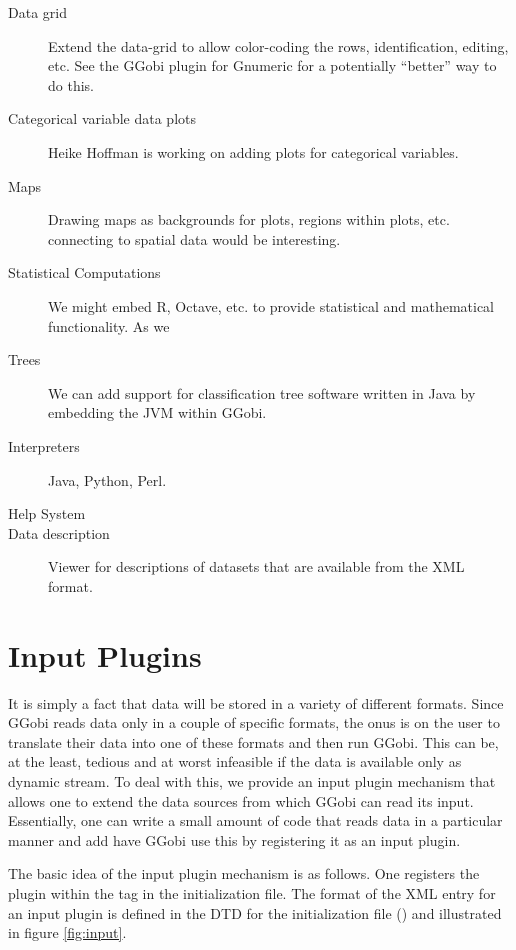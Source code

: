 \documentclass{article}
\def\file#1{\href{#1}{\Escape{#1}}}
\begin{document}
\begin{description}

\item[Data grid] Extend the data-grid to allow color-coding the rows,
identification, editing, etc.  See the GGobi plugin for Gnumeric for a
potentially ``better'' way to do this.

\item[Categorical variable data plots]
Heike Hoffman is working on
adding plots for categorical variables.

\item[Maps]
Drawing maps  as backgrounds for plots,
regions within plots, etc.
connecting to spatial data would be interesting.

\item[Statistical Computations] We might embed R, Octave, etc.  to
provide statistical and mathematical functionality.  As we

\item[Trees]
We can add support for classification tree software
written in Java by embedding the JVM within GGobi.

\item[Interpreters]
Java, Python, Perl.

\item[Help System]

\item[Data description]
Viewer for descriptions of datasets
that are available from the XML
format.

\end{description}

\section{Input Plugins}\label{sec:InputPlugins}
It is simply a fact that data will be stored in a variety of different
formats. Since GGobi reads data only in a couple of specific formats,
the onus is on the user to translate their data into one of these
formats and then run GGobi. This can be, at the least, tedious and at
worst infeasible if the data is available only as dynamic stream.  To
deal with this, we provide an input plugin mechanism that allows one
to extend the data sources from which GGobi can read its input.
Essentially, one can write a small amount of code that reads
data in a particular manner and add have GGobi use this 
by registering it as an input plugin.

The basic idea of the input plugin mechanism is as follows.  One
registers the plugin within the  tag in the
initialization file.  The format of the XML entry for an input plugin
is defined in the DTD for the initialization file
(\file{GGobiInit.dtd}) and illustrated in figure \ref{fig:input}.
\end{document}
